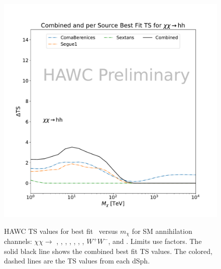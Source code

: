 \begin{figure}[h]
{    \includegraphics[scale=0.21]{figures/mtd_hawc_dm/results/CombinedTS_New_duck_hh_.pdf}
    }
    \caption{HAWC TS values for best fit \sv~versus $m_\chi$ for SM annihilation channels: $\chi\chi \rightarrow $ , , , , , , , $W^+ W^-$, and . Limits use \LS \J factors. The solid black line shows the combined best fit TS values. The colored, dashed lines are the TS values from each dSph.}
\label{fig:mtd_TS_1of2}
\end{figure}

